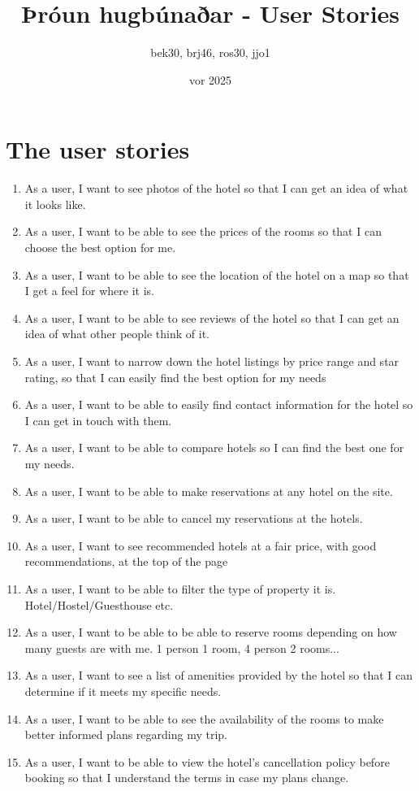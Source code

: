\documentclass{article}
\title{Þróun hugbúnaðar - User Stories}
\author{ bek30, brj46, ros30, jjo1 }
\date{vor 2025}
\begin{document}
\maketitle

\section{The user stories}

\begin{enumerate}
    \item As a user, I want to see photos of the hotel so that I can get an idea of what it looks like.
    \item As a user, I want to be able to see the prices of the rooms so that I can choose the best option for me.
    \item As a user, I want to be able to see the location of the hotel on a map so that I get a feel for where it is.
    \item As a user, I want to be able to see reviews of the hotel so that I can get an idea of what other people think of it.
    \item As a user, I want to narrow down the hotel listings by price range and star rating, so that I can easily find the best option for my needs    
    \item As a user, I want to be able to easily find contact information for the hotel so I can get in touch with them.
    \item As a user, I want to be able to compare hotels so I can find the best one for my needs.
    \item As a user, I want to be able to make reservations at any hotel on the site. %
    \item As a user, I want to be able to cancel my reservations at the hotels. %
    \item As a user, I want to see recommended hotels at a fair price, with good recommendations, at the top of the page
    \item As a user, I want to be able to filter the type of property it is. Hotel/Hostel/Guesthouse etc.
    \item As a user, I want to be able to be able to reserve rooms depending on how many guests are with me. 1 person 1 room, 4 person 2 rooms...
    \item As a user, I want to see a list of amenities provided by the hotel so that I can determine if it meets my specific needs.
    \item As a user, I want to be able to see the availability of the rooms to make better informed plans regarding my trip.
    \item As a user, I want to be able to view the hotel's cancellation policy before booking so that I understand the terms in case my plans change.
\end{enumerate}
\end{document}
